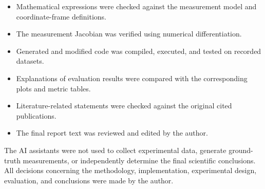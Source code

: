 \documentclass[report.tex]{subfiles}
\begin{document}
\begin{itemize}
    \item Mathematical expressions were checked against the measurement model and coordinate-frame definitions.
    \item The measurement Jacobian was verified using numerical differentiation.
    \item Generated and modified code was compiled, executed, and tested on recorded datasets.
    \item Explanations of evaluation results were compared with the corresponding plots and metric tables.
    \item Literature-related statements were checked against the original cited publications.
    \item The final report text was reviewed and edited by the author.
\end{itemize}

The AI assistants were not used to collect experimental data, generate ground-truth measurements, or independently determine the final scientific conclusions. All decisions concerning the methodology, implementation, experimental design, evaluation, and conclusions were made by the author.
    
\end{document}
